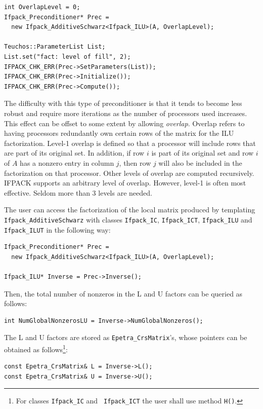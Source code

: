 {\begin{verbatim}
int OverlapLevel = 0;
Ifpack_Preconditioner* Prec = 
  new Ifpack_AdditiveSchwarz<Ifpack_ILU>(A, OverlapLevel);

Teuchos::ParameterList List;
List.set("fact: level of fill", 2);
IFPACK_CHK_ERR(Prec->SetParameters(List));
IFPACK_CHK_ERR(Prec->Initialize());
IFPACK_CHK_ERR(Prec->Compute());
\end{verbatim}

The difficulty with this type of preconditioner is that it tends to become
less robust and require more iterations as the number of processors used
increases.  This effect can be offset to some extent by allowing {\em
overlap}.  Overlap refers to having processors redundantly own certain rows
of the matrix for the ILU factorization.  Level-1 overlap is defined so
that a processor will include rows that are part of its original set.  In
addition, if row $i$ is part of its original set and row $i$ of $A$ has a
nonzero entry in column $j$, then row $j$ will also be included in the
factorization on that processor.  Other levels of overlap are computed
recursively.  IFPACK supports an arbitrary level of overlap.  However,
level-1 is often most effective.  Seldom more than 3 levels are needed. 

\smallskip

The user can access the factorization of the local matrix produced by
templating \verb!Ifpack_AdditiveSchwarz! with classes \verb!Ifpack_IC!,
  \verb!Ifpack_ICT!, \verb!Ifpack_ILU! and \verb!Ifpack_ILUT! in the following
  way:
\begin{verbatim}
Ifpack_Preconditioner* Prec = 
  new Ifpack_AdditiveSchwarz<Ifpack_ILU>(A, OverlapLevel);

Ifpack_ILU* Inverse = Prec->Inverse();
\end{verbatim}
Then, the total number of nonzeros in the L and U factors can be queried as
follows:
\begin{verbatim}
int NumGlobalNonzerosLU = Inverse->NumGlobalNonzeros();
\end{verbatim}
The L and U factors are stored as \verb!Epetra_CrsMatrix!'s, whose pointers
can be obtained as follows\footnote{For classes {\tt Ifpack\_IC} and {\tt
  Ifpack\_ICT} the user shall use method {\tt H()}.}:
\begin{verbatim}
const Epetra_CrsMatrix& L = Inverse->L();
const Epetra_CrsMatrix& U = Inverse->U();
\end{verbatim}

}
